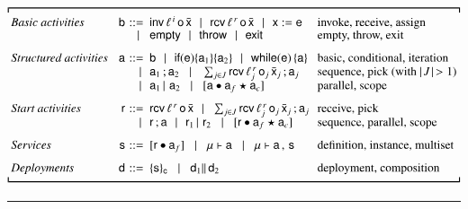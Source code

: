 \begin{table}[t]
\begin{center}
\begin{small}
$$
\delimite{
\begin{array}{
@{\hspace{-0.0ex}}l@{\hspace{2ex}}r@{\hspace{.75ex}}l@{\!}l@{\hspace{1.5ex}}l@{\hspace{0ex}}}
\textit{Basic activities} & \xa & ::= &
\xinv{\plinv}{\xo}{\bar{\xx}} \!\sepgr\!
\xrec{\plrec}{\xo}{\bar{\xx}} \!\sepgr\!
\xass{\xx}{\xe} & \textrm{invoke, receive, assign}\\[-.05cm]
 &  & \!\sepgr\! &
\xskip \!\sepgr\!
\xthr \!\sepgr\!
\xexit & \textrm{empty, throw, exit}\\[0.25cm]
%
\textit{Structured activities} & \xs & ::= &
\xa \!\sepgr\!
\xif{\xe}{\xs_1}{\xs_2} \!\sepgr\!
\xwhile{\xe}{\xs} & \textrm{basic, conditional, iteration}\\[-.02cm]
& & \sepgr & \xs_1\xsucc\xs_2 \sepgr
\sum_{j \in J}\xrec{\plrec_j}{\xo_j}{\bar{\xx}_j}\recsep\xs_j &
\textrm{sequence, pick (with $\length{J} \,> 1$)}\\[-.05cm] & & \sepgr & \xs_1
\xpar\, \xs_2 \sepgr \xscopefc{\xs}{\xh_f}{\xh_c} & \textrm{parallel, scope}
\\[0.25cm]
%
\textit{Start activities} & \xsa & ::= &
\xrec{\plrec}{\xo}{\bar{\xx}} \!\sepgr\!
\sum_{j\in J}\xrec{\plrec_j}{\xo_j}{\bar{\xx}_j}\recsep\xs_j & \textrm{receive,
pick}\\[-.05cm] & & \sepgr & \xsa \xsucc \xs \!\sepgr\! \xsa_1 \xpar\, \xsa_2
\sepgr \xscopefc{\xsa}{\xh_f}{\xh_c} & \textrm{sequence, parallel,
scope}\\[0.25cm]
%
\textit{Services} & \xI & ::= &
\xproc{\xsa}{\xh_f} \sepgr
\xinst{\xsigma}{\xs} \sepgr
\xinst{\xsigma}{\xs} \xmid \xI & \textrm{definition, instance,
multiset}\\[0.25cm]
%
\textit{Deployments} & \xd & ::= &
\xeng{\xI}{\xcorr} \sepgr
\xd_1 \xspar \xd_2 &  \textrm{deployment, composition}
\end{array}
}
$$
\end{small}
  \vspace*{-1.20cm}
  \caption{La sintassi di Blite}
   \label{tab:syntaxwsbpel}
	\rule{7cm}{0.01cm}
  \end{center} 	
\end{table}


